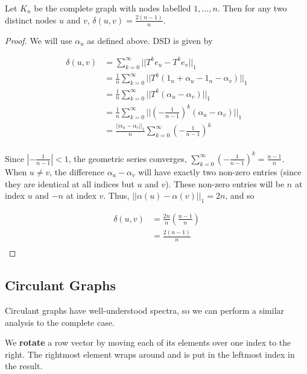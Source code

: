 \begin{theorem}
  Let $K_n$ be the complete graph with nodes labelled $1,...,n$. Then for any
  two distinct nodes $u$ and $v$, $\delta(u,v) = \frac{2(n-1)}{n}$.
\end{theorem}
\begin{proof}
  We will use $\alpha_u$ as defined above. DSD is given by

\begin{align*}
  \delta(u,v) &= \sum_{k = 0}^{\infty}{||T^ke_u - T^ke_v||_1} \\
              &= \frac{1}{n}\sum_{k = 0}^{\infty}{||T^k(1_n + \alpha_u - 1_n -
                \alpha_v)||_1}\\
              &= \frac{1}{n}\sum_{k = 0}^{\infty}{||T^k(\alpha_u - \alpha_v)||_1} \\
              &= \frac{1}{n}\sum_{k = 0}^{\infty}{||(-\frac{1}{n-1})^k(\alpha_u -
                \alpha_v)||_1} \\
              &= \frac{||\alpha_u - \alpha_v||_1}{n}
                \sum_{k = 0}^{\infty}{(-\frac{1}{n-1})^k} \\
\end{align*}

Since $|-\frac{1}{n-1}| < 1$, the geometric series converges,
$\sum_{k=0}^{\infty}(-\frac{1}{n-1})^k = \frac{n-1}{n}$. When $u \neq v$, the
difference $\alpha_u - \alpha_v$ will have exactly two non-zero entries (since
they are identical at all indices but $u$ and $v$). These non-zero entries will
be $n$ at index $u$ and $-n$ at index $v$. Thus,
$||\alpha(u)-\alpha(v)||_1 = 2n$, and so

\begin{align*}
  \delta(u,v) &= \frac{2n}{n}(\frac{n-1}{n}) \\
              &= \frac{2(n-1)}{n} \\
\end{align*}

\end{proof}

\subsection{Circulant Graphs}

Circulant graphs have well-understood spectra, so we can perform a similar
analysis to the complete case.

\begin{definition}
  We {\bf rotate} a row vector by moving each of its elements over one index to
  the right. The rightmost element wraps around and is put in the leftmost index
  in the result.
\end{definition}

